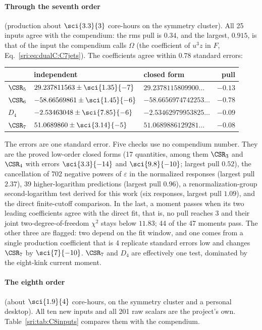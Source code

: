 \paragraph{Through the seventh order} (production about $\sci{3.3}{3}$ core-hours on the symmetry cluster). All 25
inputs agree with the compendium: the rms pull is $0.34$, and the largest, $0.915$, is that of the input the compendium
calls $\Omega$ (the coefficient of $u^3z$ in $F$, Eq.~\eqref{sri:eq:dualC:C7jets}). The coefficients agree within $0.78$ standard errors:
\begin{center}\small
\begin{tabular}{@{}lllr@{}}
\toprule
& independent & closed form & pull\\
\midrule
$\CSR_5$ & $29.237811563\pm\sci{1.35}{-7}$ & $29.2378115809900\ldots$ & $-0.13$\\
$\CSR_6$ & $-58.66569861\pm\sci{1.45}{-6}$ & $-58.6656974742253\ldots$ & $-0.78$\\
$D_4$ & $-2.53463048\pm\sci{7.85}{-6}$ & $-2.53462979953825\ldots$ & $-0.09$\\
$\CSR_7$ & $51.0689860\pm\sci{3.14}{-5}$ & $51.0689886129281\ldots$ & $-0.08$\\
\bottomrule
\end{tabular}
\end{center}
The errors are one standard error. Five checks use no compendium number. They are the proved low-order closed forms
(17 quantities, among them $\CSR_3$ and $\CSR_4$ with errors $\sci{3.3}{-14}$ and $\sci{9.8}{-10}$; largest pull
$0.52$), the cancellation of 702 negative powers of $\varepsilon$ in the normalized responses (largest pull $2.37$),
39 higher-logarithm predictions (largest pull $0.96$), a renormalization-group second-logarithm test derived for this
work (six responses, largest pull $1.09$), and the direct finite-cutoff comparison. In the last, a moment passes when
its two leading coefficients agree with the direct fit, that is, no pull reaches 3 and their joint
two-degree-of-freedom $\chi^2$ stays below $11.83$; 44 of the 47 moments pass. The other three are flagged: two depend
on the fit window, and one comes from a single production coefficient that is 4 replicate standard errors low and
changes $\CSR_7$ by $\sci{7}{-10}$. $\CSR_7$ and $D_4$ are effectively one test, dominated by the eight-kink current
moment.

\paragraph{The eighth order} (about $\sci{1.9}{4}$ core-hours, on the symmetry cluster and a personal desktop). All
ten new inputs and all 201 raw scalars are the project's own. Table~\ref{sri:tab:C8inputs} compares them with the
compendium.

